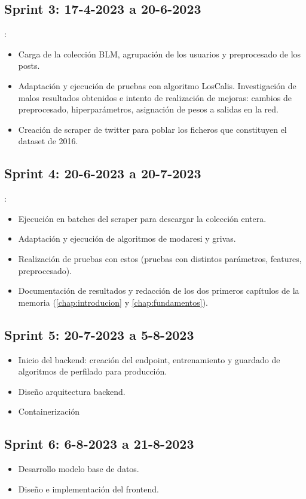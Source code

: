 \subsection{Sprint 3: 17-4-2023 a 20-6-2023}%
:
\begin{itemize}
    \item Carga de la colección BLM, agrupación de los usuarios y preprocesado de los posts.
    \item Adaptación y ejecución de pruebas con algoritmo LosCalis. Investigación de malos resultados obtenidos e intento de realización de mejoras: cambios de preprocesado, hiperparámetros, asignación de pesos a salidas en la red.
    \item Creación de scraper de twitter para poblar los ficheros que constituyen el dataset de 2016.
\end{itemize}

\subsection{Sprint 4: 20-6-2023 a 20-7-2023}
:
\begin{itemize}
    \item Ejecución en batches del scraper para descargar la colección entera.
    \item Adaptación y ejecución de algoritmos de modaresi y grivas.
    \item Realización de pruebas con estos (pruebas con distintos parámetros, features, preprocesado).
    \item Documentación de resultados y redacción de los dos primeros capítulos de la memoria  (\ref{chap:introducion} y \ref{chap:fundamentos}).
\end{itemize}
\subsection{Sprint 5: 20-7-2023 a 5-8-2023}
\begin{itemize}
    \item Inicio del backend: creación del endpoint, entrenamiento y guardado de algoritmos de perfilado para producción.
    \item Diseño arquitectura backend.
    \item Containerización
\end{itemize}
\subsection{Sprint 6: 6-8-2023 a 21-8-2023}
\begin{itemize}
    \item Desarrollo modelo base de datos.
    \item Diseño e implementación del frontend.
\end{itemize}
